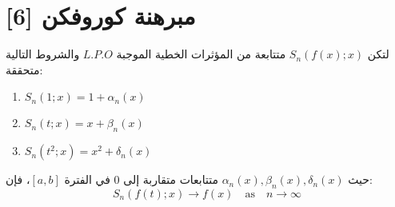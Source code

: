 	\section{مبرهنة كوروفكن  [6]}
	لتكن \( S_n(f(x); x) \) متتابعة من المؤثرات الخطية الموجبة \( L.P.O \) والشروط التالية متحققة:
\begin{english}
		\begin{enumerate}
		\item \( S_n(1; x) = 1 + \alpha_n(x) \)
		\item \( S_n(t; x) = x + \beta_n(x) \)
		\item \( S_n(t^2; x) = x^2 + \delta_n(x) \)
	\end{enumerate}
\end{english}
	حيث \( \alpha_n(x), \beta_n(x), \delta_n(x) \) متتابعات متقاربة  إلى 0 في الفترة \([a, b]\)، فإن:
	\[
	S_n(f(t); x) \to f(x) \quad \text{as} \quad n \to \infty
	\]
	